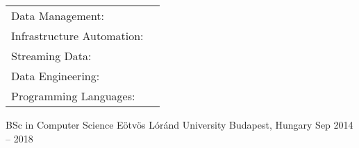 \documentclass[]{awesome-cv}
\begin{document}
\begin{cventries}
	\cventry
	{}
	{\def\arraystretch{1.15}{\begin{tabular}{ l l }
		Data Management: & {\skill{ Snowflake, BigQuery, Redshift, DuckDB, Databricks, SQL, Data Lakes, Looker }} \\
		Infrastructure Automation: & {\skill{ GCP, AWS, Terraform, Docker, Kubernetes, CI/CD, GNU/Linux }} \\
		Streaming Data: & {\skill{ Kafka, Flink, Redpanda, CDC (Debezium), Kinesis, Event-driven architectures }} \\
		Data Engineering: & {\skill{ dbt, Airflow, Dagster, Fivetran, Meltano }} \\
		Programming Languages: & {\skill { Python, Go, Shell Scripting }} \\
		\end{tabular}}}
	{}
	{}
	{}
\end{cventries}

\begin{cventries}
	\cventry
	{BSc in Computer Science}
	{Eötvös Lóránd University}
	{Budapest, Hungary}
	{Sep 2014 – 2018}
	{}
\end{cventries}

\vspace{-2mm}
\ 
\end{document}
